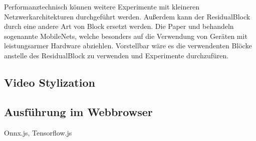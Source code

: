 Performanztechnisch können weitere Experimente mit kleineren Netzwerkarchitekturen durchgeführt werden. Außerdem kann der ResidualBlock durch eine andere Art von Block ersetzt werden. Die Paper \cite{DBLP:journals/corr/HowardZCKWWAA17} und \cite{DBLP:journals/corr/abs-1801-04381} behandeln sogenannte MobileNets, welche besonders auf die Verwendung von Geräten mit leistungsarmer Hardware abziehlen. Vorstellbar wäre es die verwendenten Blöcke anstelle des ResidualBlock zu verwenden und Experimente durchzufüren.

\subsection{Video Stylization}
\label{sec:video_stylization}
\cite{DBLP:journals/corr/abs-1807-01197}

\subsection{Ausführung im Webbrowser}
\label{sec:inference_in_browser}

Onnx.js, Tensorflow.js